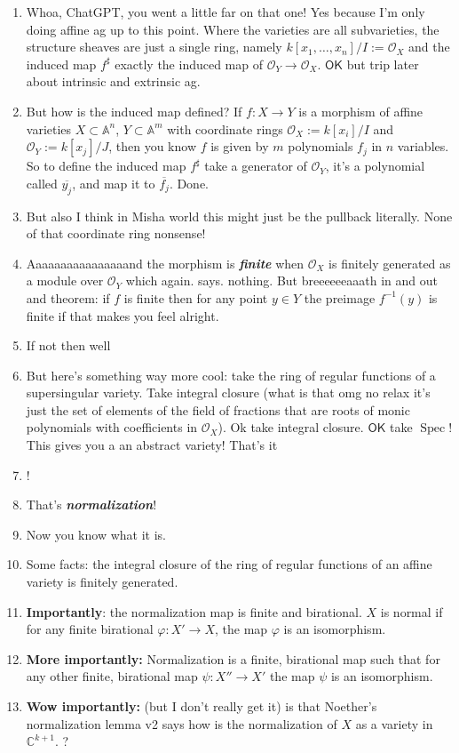 \begin{enumerate}
\item Whoa, ChatGPT, you went a little far on that one! Yes because I'm only doing affine ag up to this point. Where the varieties are all subvarieties, the structure sheaves are just a single ring, namely \(k[x_1,\ldots,x_n]/I:=\mathcal{O}_X\) and the induced map \(f^\sharp\) exactly the induced map of \(\mathcal{O}_Y \to \mathcal{O}_X\). \(\mathsf{OK}\) but trip later about intrinsic and extrinsic ag.
\item But how is the induced map defined? If \(f:X \to Y\) is a morphism of affine varieties \(X \subset \mathbb{A}^n\), \(Y\subset \mathbb{A}^m\) with coordinate rings \(\mathcal{O}_X:=k[x_i]/I\) and \(\mathcal{O}_Y:=k[x_j]/J\), then you know \(f\) is given by \(m\) polynomials \(f_j\) in \(n\) variables. So to define the induced map \(f^\sharp\) take a generator of \(\mathcal{O}_Y\), it's a polynomial called \(\overline{y_j}\), and map it to \(\overline{f_j}\). Done.
\item But also I think in Misha world this might just be the pullback literally. None of that coordinate ring nonsense!
\item Aaaaaaaaaaaaaaaand the morphism is \textit{\textbf{finite}} when \(\mathcal{O}_X\) is finitely generated as a module over \(\mathcal{O}_Y\) which again. says. nothing. But breeeeeeaaath in and out and theorem: if \(f\) is finite then for any point \(y \in Y\) the preimage \(f^{-1}(y)\) is finite if that makes you feel alright.
\item If not then well 
\item But here's something way more cool: take the ring of regular functions of a supersingular variety. Take integral closure (what is that omg no relax it's just the set of elements of the field of fractions that are roots of monic polynomials with coefficients in  \(\mathcal{O}_X\)). Ok take integral closure. \(\mathsf{OK}\) take \(\operatorname{Spec}\)! This gives you a an abstract variety! That's it
\item !
\item That's \textit{\textbf{normalization}}!
\item Now you know what it is.
\item Some facts: the integral closure of the ring of regular functions of an affine variety is finitely generated.
\item \textbf{Importantly}: the normalization map is finite and birational. \(X\) is normal if for any finite birational \(\varphi:X' \to X\), the map \(\varphi\) is an isomorphism.
\item \textbf{More importantly:} Normalization is a finite, birational map such that for any other finite, birational map \(\psi:X'' \to X'\) the map \(\psi\) is an isomorphism.
\item \textbf{Wow importantly:} (but I don't really get it) is that Noether's normalization lemma v2 says how is the normalization of \(X\) as a variety in \(\mathbb{C}^{k+1}\). ?
\end{enumerate}

